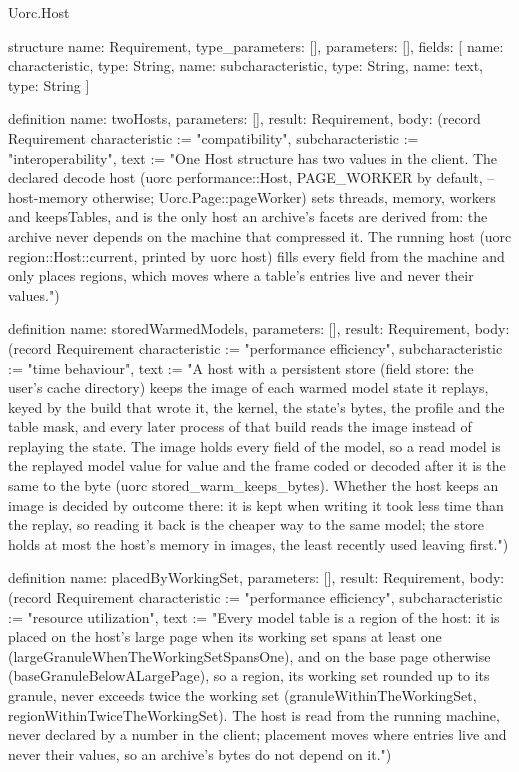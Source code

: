 \begin{lexlean}{Uorc.Host}
\begin{semanticmodule}
structure{
  name: Requirement,
  type_parameters: [],
  parameters: [],
  fields: [
    {name: characteristic, type: String},
    {name: subcharacteristic, type: String},
    {name: text, type: String}
  ]
}

definition{
  name: twoHosts,
  parameters: [],
  result: Requirement,
  body: (record Requirement {characteristic := "compatibility", subcharacteristic := "interoperability", text := "One Host structure has two values in the client. The declared decode host (uorc performance::Host, PAGE_WORKER by default, --host-memory otherwise; Uorc.Page::pageWorker) sets threads, memory, workers and keepsTables, and is the only host an archive's facets are derived from: the archive never depends on the machine that compressed it. The running host (uorc region::Host::current, printed by uorc host) fills every field from the machine and only places regions, which moves where a table's entries live and never their values."})
}

definition{
  name: storedWarmedModels,
  parameters: [],
  result: Requirement,
  body: (record Requirement {characteristic := "performance efficiency", subcharacteristic := "time behaviour", text := "A host with a persistent store (field store: the user's cache directory) keeps the image of each warmed model state it replays, keyed by the build that wrote it, the kernel, the state's bytes, the profile and the table mask, and every later process of that build reads the image instead of replaying the state. The image holds every field of the model, so a read model is the replayed model value for value and the frame coded or decoded after it is the same to the byte (uorc stored_warm_keeps_bytes). Whether the host keeps an image is decided by outcome there: it is kept when writing it took less time than the replay, so reading it back is the cheaper way to the same model; the store holds at most the host's memory in images, the least recently used leaving first."})
}

definition{
  name: placedByWorkingSet,
  parameters: [],
  result: Requirement,
  body: (record Requirement {characteristic := "performance efficiency", subcharacteristic := "resource utilization", text := "Every model table is a region of the host: it is placed on the host's large page when its working set spans at least one (largeGranuleWhenTheWorkingSetSpansOne), and on the base page otherwise (baseGranuleBelowALargePage), so a region, its working set rounded up to its granule, never exceeds twice the working set (granuleWithinTheWorkingSet, regionWithinTwiceTheWorkingSet). The host is read from the running machine, never declared by a number in the client; placement moves where entries live and never their values, so an archive's bytes do not depend on it."})
}


\end{semanticmodule}
\end{lexlean}
